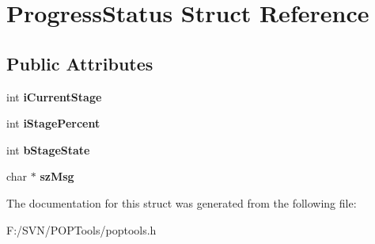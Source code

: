 \hypertarget{struct_progress_status}{\section{Progress\-Status Struct Reference}
\label{struct_progress_status}
}
\subsection*{Public Attributes}
\begin{DoxyCompactItemize}
\item 
\hypertarget{struct_progress_status_a4bec96e044fbfd2cc6ee042c4bc4b8dd}{int {\bfseries i\-Current\-Stage}}\label{struct_progress_status_a4bec96e044fbfd2cc6ee042c4bc4b8dd}

\item 
\hypertarget{struct_progress_status_a03cb1f3572513118c1e4c202508f2008}{int {\bfseries i\-Stage\-Percent}}\label{struct_progress_status_a03cb1f3572513118c1e4c202508f2008}

\item 
\hypertarget{struct_progress_status_a29c08fe734146bb22c8d23bfa8592cc3}{int {\bfseries b\-Stage\-State}}\label{struct_progress_status_a29c08fe734146bb22c8d23bfa8592cc3}

\item 
\hypertarget{struct_progress_status_a61bcd7975cee9b969442da7e9a3dc518}{char $\ast$ {\bfseries sz\-Msg}}\label{struct_progress_status_a61bcd7975cee9b969442da7e9a3dc518}

\end{DoxyCompactItemize}


The documentation for this struct was generated from the following file\-:\begin{DoxyCompactItemize}
\item 
F\-:/\-S\-V\-N/\-P\-O\-P\-Tools/poptools.\-h\end{DoxyCompactItemize}

